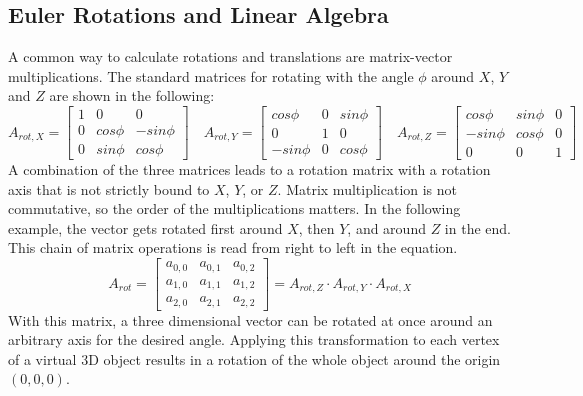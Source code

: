 \subsection{Euler Rotations and Linear Algebra}
A common way to calculate rotations and translations are matrix-vector multiplications. The standard matrices for rotating with the angle $\phi$ around $X$, $Y$ and $Z$ are shown in the following:
\begin{equation*}
    A_{rot,X} =
    \begin{bmatrix}
        1 & 0        & 0         \\
        0 & cos \phi & -sin \phi \\
        0 & sin \phi & cos \phi
    \end{bmatrix}
    \quad
    A_{rot,Y} =
    \begin{bmatrix}
        cos \phi  & 0 & sin \phi \\
        0         & 1 & 0        \\
        -sin \phi & 0 & cos \phi
    \end{bmatrix}
    \quad
    A_{rot,Z} =
    \begin{bmatrix}
        cos \phi  & sin \phi & 0 \\
        -sin \phi & cos \phi & 0 \\
        0         & 0        & 1
    \end{bmatrix}
\end{equation*}
A combination of the three matrices leads to a rotation matrix with a rotation axis that is not strictly bound to $X$, $Y$, or $Z$. Matrix multiplication is not commutative, so the order of the multiplications matters. In the following example, the vector gets rotated first around $X$, then $Y$, and around $Z$ in the end. This chain of matrix operations is read from right to left in the equation.
\begin{equation*}
    A_{rot} =
    \begin{bmatrix}
        a_{0,0} & a_{0,1} & a_{0,2} \\
        a_{1,0} & a_{1,1} & a_{1,2} \\
        a_{2,0} & a_{2,1} & a_{2,2}
    \end{bmatrix}
    =A_{rot,Z} \cdot A_{rot,Y} \cdot A_{rot,X}
\end{equation*}
With this matrix, a three dimensional vector can be rotated at once around an arbitrary axis for the desired angle. Applying this transformation to each vertex of a virtual 3D object results in a rotation of the whole object around the origin $(0,0,0)$.\\
